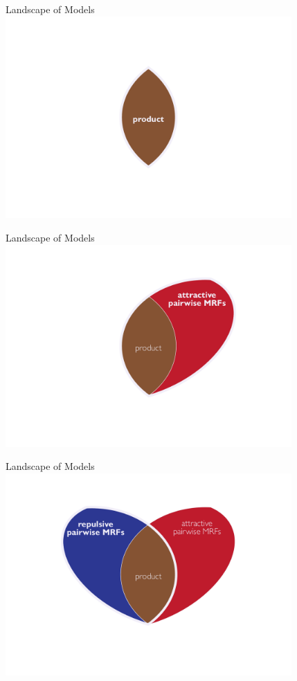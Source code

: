 \begin{frame}{Landscape of Models}
\vspace{0.5em}
\centering
\includegraphics[width=4.3in]{figures/venn01.pdf}
\end{frame}

\begin{frame}{Landscape of Models}
\vspace{0.5em}
\centering
\includegraphics[width=4.3in]{figures/venn02.pdf}
\end{frame}

\begin{frame}{Landscape of Models}
\vspace{0.5em}
\centering
\includegraphics[width=4.3in]{figures/venn03.pdf}
\end{frame}

